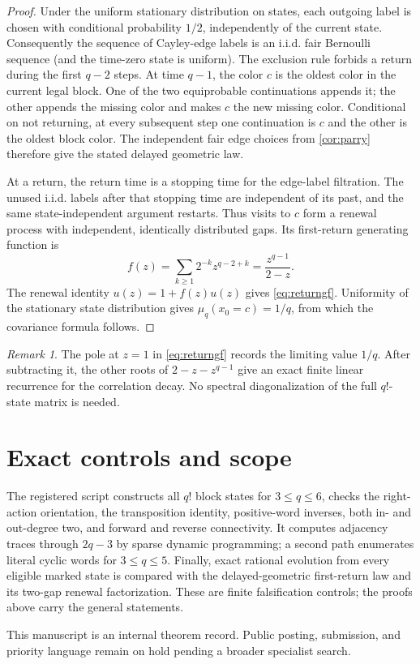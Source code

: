 \documentclass[11pt,a4paper]{amsart}
\theoremstyle{definition}
\theoremstyle{remark}
\newtheorem{remark}[theorem]{Remark}
\begin{document}
\begin{proof}
Under the uniform stationary distribution on states, each outgoing label is
chosen with conditional probability $1/2$, independently of the current
state.  Consequently the sequence of Cayley-edge labels is an i.i.d. fair
Bernoulli sequence (and the time-zero state is uniform).  The exclusion rule
forbids a return during the first $q-2$ steps.  At time
$q-1$, the color $c$ is the oldest color in the current legal block.  One
of the two equiprobable continuations appends it; the other appends the
missing color and makes $c$ the new missing color.  Conditional on not
returning, at every subsequent step one continuation is $c$ and the other
is the oldest block color.  The independent fair edge choices from
\cref{cor:parry} therefore give the stated delayed geometric law.

At a return, the return time is a stopping time for the edge-label filtration.
The unused i.i.d. labels after that stopping time are independent of its past,
and the same state-independent argument restarts.  Thus visits to $c$ form a
renewal process with independent, identically distributed gaps.  Its
first-return generating function is
\[
 f(z)=\sum_{k\geq1}2^{-k}z^{q-2+k}
     =\frac{z^{q-1}}{2-z}.
\]
The renewal identity $u(z)=1+f(z)u(z)$ gives \eqref{eq:returngf}.  Uniformity
of the stationary state distribution gives $\mu_q(x_0=c)=1/q$, from which
the covariance formula follows.
\end{proof}

\begin{remark}
The pole at $z=1$ in \eqref{eq:returngf} records the limiting value $1/q$.
After subtracting it, the other roots of $2-z-z^{q-1}$ give an exact finite
linear recurrence for the correlation decay.  No spectral diagonalization
of the full $q!$-state matrix is needed.
\end{remark}

\section{Exact controls and scope}

The registered script constructs all $q!$ block states for $3\leq q\leq6$,
checks the right-action orientation, the transposition identity, positive-word
inverses, both in- and out-degree two, and forward and reverse connectivity.
It computes adjacency traces through $2q-3$ by sparse dynamic programming; a
second path enumerates literal cyclic words for $3\leq q\leq5$.  Finally,
exact rational evolution from every eligible marked state is compared with
the delayed-geometric first-return law and its two-gap renewal factorization.
These are finite falsification controls; the proofs above carry the general
statements.

This manuscript is an internal theorem record.  Public posting, submission,
and priority language remain on hold pending a broader specialist search.



\end{document}
